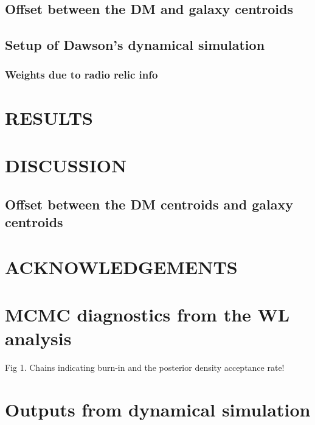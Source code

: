 \documentclass[letterpaper,useAMS,usenatbib]{mn2e}
\begin{document}
\subsection{Offset between the DM and galaxy centroids}

\subsection{Setup of Dawson's dynamical simulation}
\subsubsection{Weights due to radio relic info}

\section{RESULTS}




\section{DISCUSSION}
\subsection{Offset between the DM centroids and galaxy centroids}
\section{ACKNOWLEDGEMENTS}



\appendix
\section{MCMC diagnostics from the WL analysis}
Fig 1. Chains indicating burn-in and the posterior density 
acceptance rate!


\section{Outputs from dynamical simulation}
\clearpage\bsp\label{lastpage} 
\end{document}
